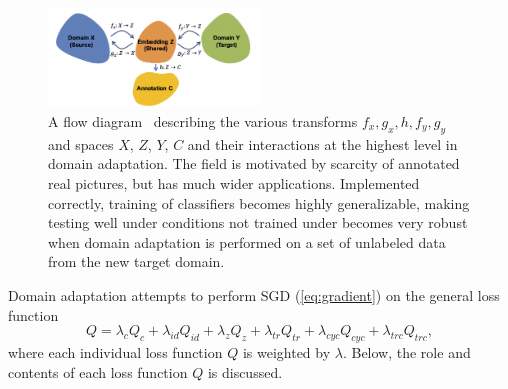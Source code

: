 \begin{figure}[ht!]
	\centering	\includegraphics[width=0.5\textwidth,keepaspectratio]{figs/domainadaptflow.png}
    \caption{A flow diagram~\cite{dadaptHRL} describing the various transforms $f_x, g_x, h, f_y, g_y$ and spaces $X$, $Z$, $Y$, $C$ and their interactions at the highest level in domain adaptation. The field is motivated by scarcity of annotated real pictures, but has much wider applications. Implemented correctly, training of classifiers becomes highly generalizable, making testing well under conditions not trained under becomes very robust when domain adaptation is performed on a set of unlabeled data from the new target domain.}
\label{fig:adaptflow}      
\end{figure}

Domain adaptation attempts to perform SGD (\ref{eq:gradient}) on the general loss function
\begin{equation}
\label{eq:genloss}
Q = \lambda_cQ_c + \lambda_{id}Q_{id} + \lambda_zQ_z + \lambda_{tr}Q_{tr} + \lambda_{cyc}Q_{cyc} + \lambda_{trc}Q_{trc},
\end{equation}
where each individual loss function $Q$ is weighted by $\lambda$. Below, the role and contents of each loss function $Q$ is discussed.

